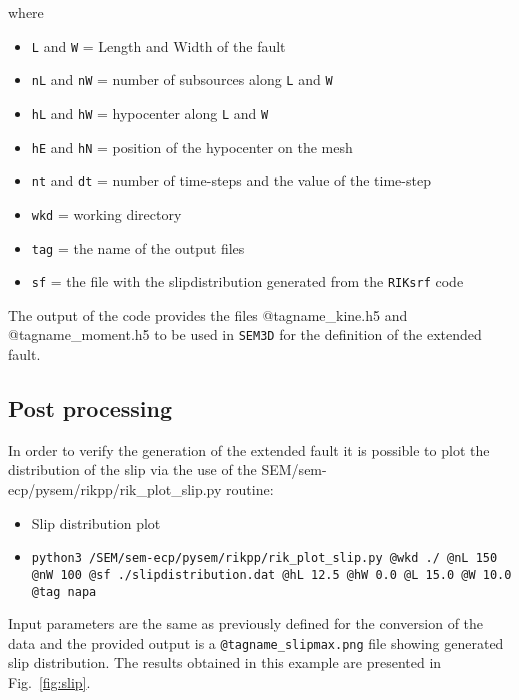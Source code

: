 where
\begin{itemize}
    \item \texttt{L} and \texttt{W} = Length and Width of the fault
    \item \texttt{nL} and \texttt{nW} = number of subsources along \texttt{L} and \texttt{W}
    \item \texttt{hL} and \texttt{hW} = hypocenter along \texttt{L} and \texttt{W}
    \item \texttt{hE} and \texttt{hN} = position of the hypocenter on the mesh
    \item \texttt{nt} and \texttt{dt} = number of time-steps and the value of the time-step
    \item \texttt{wkd} = working directory
    \item \texttt{tag} = the name of the output files
    \item \texttt{sf} = the file with the slipdistribution generated from the \texttt{RIKsrf} code
\end{itemize} 

The output of the code provides the files @tagname\_kine.h5 and @tagname\_moment.h5 to be used in \texttt{SEM3D} for the definition of the extended fault.

\subsection{Post processing}
In order to verify the generation of the extended fault it is possible to plot the distribution of the slip via the use of the SEM/sem-ecp/pysem/rikpp/rik\_plot\_slip.py routine:
\begin{itemize}
    \item Slip distribution plot
    \item[] \texttt{python3 /SEM/sem-ecp/pysem/rikpp/rik\_plot\_slip.py @wkd ./ @nL 150 @nW 100 @sf ./slipdistribution.dat @hL 12.5 @hW 0.0 @L 15.0 @W 10.0 @tag napa}
\end{itemize}
Input parameters are the same as previously defined for the conversion of the data and the provided output is a \texttt{@tagname\_slipmax.png} file showing generated slip distribution. The results obtained in this example are presented in Fig.~\ref{fig:slip}.

